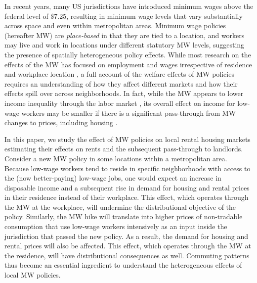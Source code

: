 

In recent years, many US jurisdictions have introduced minimum wages above the 
federal level of \$7.25, resulting in minimum wage levels that vary 
substantially across space and even within metropolitan areas.
Minimum wage policies (hereafter MW) are \textit{place-based} in that they are 
tied to a location, and workers may live and work in locations under different 
statutory MW levels, suggesting the presence of spatially heterogeneous policy 
effects.
While most research on the effects of the MW has focused on employment and 
wages irrespective of residence and workplace location
\parencite[e.g.,][]{CardKrueger1994, CegnizEtAl2019},
a full account of the welfare effects of MW policies requires an understanding 
of how they affect different markets and how their effects spill over across 
neighborhoods.
In fact, while the MW appears to lower income inequality through the labor 
market \parencite{Lee1999, AutorEtAl2016},
its overall effect on income for low-wage workers may be smaller if there is 
a significant pass-through from MW changes to prices, including housing
\parencite{Macurdy2015}.

In this paper, we study the effect of MW policies on local rental housing 
markets estimating their effects on rents and the subsequent pass-through
to landlords.
Consider a new MW policy in some locations within a metropolitan area.
Because low-wage workers tend to reside in specific neighborhoods with access 
to the (now better-paying) low-wage jobs,
one would expect an increase in disposable income and a subsequent rise in demand 
for housing and rental prices in their residence instead of their workplace.
This effect, which operates through the MW at the workplace, 
will undermine the distributional objective of the policy.
Similarly, the MW hike will translate into higher prices of non-tradable 
consumption that use low-wage workers intensively as an input inside the 
jurisdiction that passed the new policy.
As a result, the demand for housing and rental prices will also be affected.
This effect, which operates through the MW at the residence, will have 
distributional consequences as well.
Commuting patterns thus become an essential ingredient to understand the 
heterogeneous effects of local MW policies.

